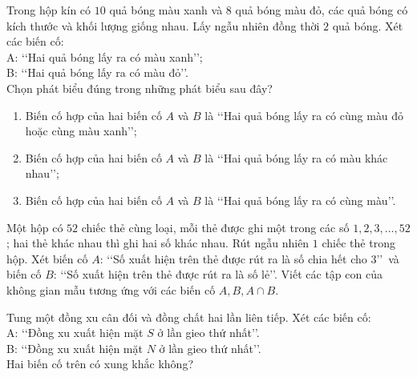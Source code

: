 \begin{vd}%
	Trong hộp kín có $10$ quả bóng màu xanh và $8$ quả bóng màu đỏ, các quả bóng có kích thước và khối lượng giống nhau. Lấy ngẫu nhiên đồng thời $2$ quả bóng. Xét các biến cố:\\
	A: \lq\lq Hai quả bóng lấy ra có màu xanh\rq\rq;\\
	B: \lq\lq Hai quả bóng lấy ra có màu đỏ\rq\rq.\\
	Chọn phát biểu đúng trong những phát biểu sau đây?
	\begin{enumerate}
		\item Biến cố hợp của hai biến cố $A$ và $B$ là \lq\lq Hai quả bóng lấy ra có cùng màu đỏ hoặc cùng màu xanh\rq\rq;
		\item Biến cố hợp của hai biến cố $A$ và $B$ là \lq\lq Hai quả bóng lấy ra có màu khác nhau\rq\rq;
		\item Biến cố hợp của hai biến cố $A$ và $B$ là \lq\lq Hai quả bóng lấy ra có cùng màu\rq\rq.
	\end{enumerate}
\end{vd}
\begin{vd}%
	Một hộp có $52$ chiếc thẻ cùng loại, mỗi thẻ được ghi một trong các số $1,2,3, \ldots, 52$; hai thẻ khác nhau thì ghi hai số khác nhau. Rút ngẫu nhiên $1$ chiếc thẻ trong hộp. Xét biến cố $A$: \lq\lq Số xuất hiện trên thẻ được rút ra là số chia hết cho 3\rq\rq \, và biến cố $B$: \lq\lq Số xuất hiện trên thẻ được rút ra là số lẻ\rq\rq. Viết các tập con của không gian mẫu tương ứng với các biến cố $A, B, A \cap B$.
\end{vd}
\begin{vd}%
	Tung một đồng xu cân đối và đồng chất hai lần liên tiếp. Xét các biến cố:\\
	A: \lq\lq Đồng xu xuất hiện mặt $S$ ở lần gieo thứ nhất\rq\rq.\\
	B: \lq\lq Đồng xu xuất hiện mặt $N$ ở lần gieo thứ nhất\rq\rq.\\
	Hai biến cố trên có xung khắc không?\\
\end{vd}
